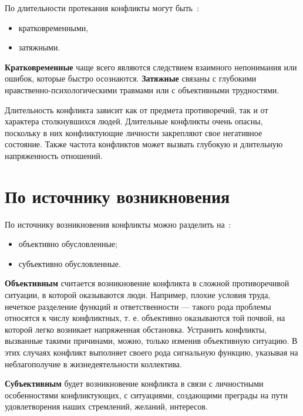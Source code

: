 По длительности протекания конфликты могут быть~\cite{book08}:
\begin{itemize}
    \item кратковременными,
    \item затяжными.
\end{itemize}

\textbf{Кратковременные} чаще всего являются следствием взаимного непонимания или ошибок,
которые быстро осознаются. \textbf{Затяжные} связаны с глубокими
нравственно-психологическими травмами или с объективными трудностями.

Длительность конфликта зависит как от предмета противоречий, так и от характера
столкнувшихся людей. Длительные конфликты очень опасны, поскольку в них
конфликтующие личности закрепляют свое негативное состояние. Также частота
конфликтов может вызвать глубокую и длительную напряженность отношений.

\section{По источнику возникновения}

По источнику возникновения конфликты можно разделить на~\cite{book08}:
\begin{itemize}
    \item объективно обусловленные;
    \item субъективно обусловленные.
\end{itemize}

\textbf{Объективным} считается возникновение конфликта в сложной противоречивой
ситуации, в которой оказываются люди. Например, плохие условия труда, нечеткое
разделение функций и ответственности --- такого рода проблемы относятся к числу
конфликтных, т. е. объективно оказываются той почвой, на которой легко возникает
напряженная обстановка. Устранить конфликты, вызванные такими причинами, можно,
только изменив объективную ситуацию. В этих случаях конфликт выполняет своего
рода сигнальную функцию, указывая на неблагополучие в жизнедеятельности
коллектива.

\textbf{Субъективным} будет возникновение конфликта в связи с личностными
особенностями конфликтующих, с ситуациями, создающими преграды на пути
удовлетворения наших стремлений, желаний, интересов.

